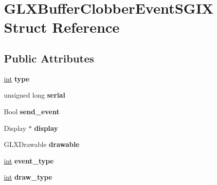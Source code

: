 \hypertarget{struct_g_l_x_buffer_clobber_event_s_g_i_x}{}\section{G\+L\+X\+Buffer\+Clobber\+Event\+S\+G\+I\+X Struct Reference}
\label{struct_g_l_x_buffer_clobber_event_s_g_i_x}
\subsection*{Public Attributes}
\begin{DoxyCompactItemize}
\item 
\hypertarget{struct_g_l_x_buffer_clobber_event_s_g_i_x_a36e3e8a5feea664623ea43d0f273b63a}{}\hyperlink{_s_d_l__thread_8h_a6a64f9be4433e4de6e2f2f548cf3c08e}{int} {\bfseries type}\label{struct_g_l_x_buffer_clobber_event_s_g_i_x_a36e3e8a5feea664623ea43d0f273b63a}

\item 
\hypertarget{struct_g_l_x_buffer_clobber_event_s_g_i_x_ac295e3276a7986eeae4d6a2a28c7e0b7}{}unsigned long {\bfseries serial}\label{struct_g_l_x_buffer_clobber_event_s_g_i_x_ac295e3276a7986eeae4d6a2a28c7e0b7}

\item 
\hypertarget{struct_g_l_x_buffer_clobber_event_s_g_i_x_af43bf0edbe40a74ef58dfb546a75118b}{}Bool {\bfseries send\+\_\+event}\label{struct_g_l_x_buffer_clobber_event_s_g_i_x_af43bf0edbe40a74ef58dfb546a75118b}

\item 
\hypertarget{struct_g_l_x_buffer_clobber_event_s_g_i_x_afef060d81026da75c846727f4a3de9d4}{}Display $\ast$ {\bfseries display}\label{struct_g_l_x_buffer_clobber_event_s_g_i_x_afef060d81026da75c846727f4a3de9d4}

\item 
\hypertarget{struct_g_l_x_buffer_clobber_event_s_g_i_x_a9c45674193ed80a79261c3b7518ee04f}{}G\+L\+X\+Drawable {\bfseries drawable}\label{struct_g_l_x_buffer_clobber_event_s_g_i_x_a9c45674193ed80a79261c3b7518ee04f}

\item 
\hypertarget{struct_g_l_x_buffer_clobber_event_s_g_i_x_a0b405123f1d6528f1f4dfa7ff92bde9b}{}\hyperlink{_s_d_l__thread_8h_a6a64f9be4433e4de6e2f2f548cf3c08e}{int} {\bfseries event\+\_\+type}\label{struct_g_l_x_buffer_clobber_event_s_g_i_x_a0b405123f1d6528f1f4dfa7ff92bde9b}

\item 
\hypertarget{struct_g_l_x_buffer_clobber_event_s_g_i_x_a25c31e8cbec0919f74a1e93ae74175b1}{}\hyperlink{_s_d_l__thread_8h_a6a64f9be4433e4de6e2f2f548cf3c08e}{int} {\bfseries draw\+\_\+type}\label{struct_g_l_x_buffer_clobber_event_s_g_i_x_a25c31e8cbec0919f74a1e93ae74175b1}


\end{DoxyCompactItemize}
